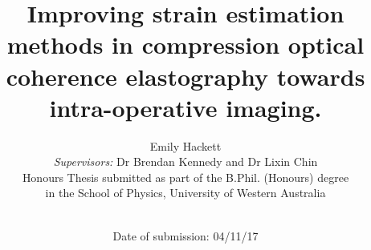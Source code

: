 \begin{titlepage}
\title{Improving strain estimation methods in compression optical coherence elastography towards intra-operative imaging.}
\author{Emily Hackett \\
{{\it Supervisors:} Dr Brendan Kennedy and Dr Lixin Chin}\\
{Honours Thesis submitted as part of the B.Phil. (Honours) degree} \\ {in the School of Physics, University of Western Australia}\\ \\}
\date{Date of submission: 04/11/17}
\maketitle
\end{titlepage}


